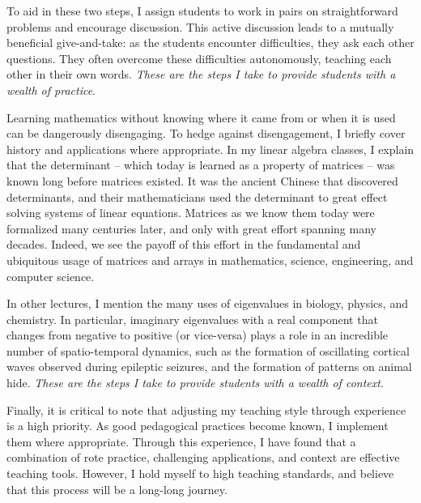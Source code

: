 \documentclass[a4paper,11pt]{article}
\begin{document}
To aid in these two steps, I assign students to work in pairs on straightforward problems and encourage discussion. This active discussion leads to a mutually beneficial give-and-take:  as the students encounter difficulties, they ask each other questions. They often overcome these difficulties autonomously, teaching each other in their own words. \textit{These are the steps I take to provide students with a wealth of practice}.

Learning mathematics without knowing where it came from or when it is used can be dangerously disengaging. To hedge against disengagement, I briefly cover history and applications where appropriate. In my linear algebra classes, I explain that the determinant -- which today is learned as a property of matrices -- was known long before matrices existed. It was the ancient Chinese that discovered determinants, and their mathematicians used the determinant to great effect solving systems of linear equations. Matrices as we know them today were formalized many centuries later, and only with great effort spanning many decades. Indeed, we see the payoff of this effort in the fundamental and ubiquitous usage of matrices and arrays in mathematics, science, engineering, and computer science.

In other lectures, I mention the many uses of eigenvalues in biology, physics, and chemistry. In particular, imaginary eigenvalues with a real component that changes from negative to positive (or vice-versa) plays a role in an incredible number of spatio-temporal dynamics, such as the formation of oscillating cortical waves observed during epileptic seizures, and the formation of patterns on animal hide. \textit{These are the steps I take to provide students with a wealth of context}.

Finally, it is critical to note that adjusting my teaching style through experience is a high priority. As good pedagogical practices become known, I implement them where appropriate. Through this experience, I have found that a combination of rote practice, challenging applications, and context are effective teaching tools. However, I hold myself to high teaching standards, and believe that this process will be a long-long journey.

% 
 
\end{document}
